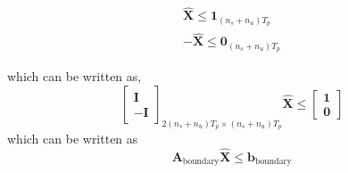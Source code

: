 \documentclass{article}
\begin{document}
\begin{align*}
\hat{\mathbf{X}} \leq \mathbf{1}_{(n_s+n_u)T_p} \\
-\hat{\mathbf{X}} \leq \mathbf{0}_{(n_s+n_u)T_p}
\end{align*}

which can be written as,
\begin{equation}
\label{boundariesconstraints}
\begin{bmatrix}
\mathbf{I}\\
-\mathbf{I}
\end{bmatrix}_{2 (n_s+n_u)T_p \times (n_s+n_u)T_p}
\hat{\mathbf{X}} \leq
\begin{bmatrix}
\mathbf{1}\\ \mathbf{0}
\end{bmatrix}
\end{equation}
which can be written as
\[
\mathbf{A}_{\text{boundary}} \hat{\mathbf{X}} \leq \mathbf{b}_{\text{boundary}}
\]
\end{document}
